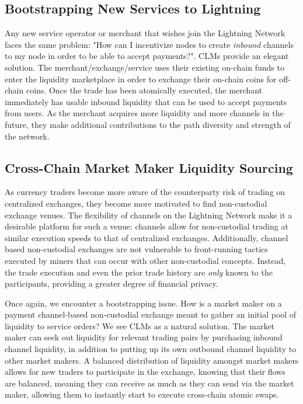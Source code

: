 \documentclass[10pt,a4paper]{article}
\theoremstyle{definition}
\begin{document}
\subsection{Bootstrapping New Services to Lightning}

Any new service operator or merchant that wishes join the Lightning Network
faces the same problem: "How can I incentivize nodes to create \emph{inbound}
channels to my node in order to be able to accept payments?". CLMs provide an
elegant solution. The merchant/exchange/service uses their existing on-chain
funds to enter the liquidity marketplace in order to exchange their on-chain
coins for off-chain coins. Once the trade has been atomically executed, the
merchant immediately has usable inbound liquidity that can be used to accept
payments from users. As the merchant acquires more liquidity and more channels
in the future, they make additional contributions to the path diversity and
strength of the network. 

\subsection{Cross-Chain Market Maker Liquidity Sourcing}

As currency traders become more aware of the counterparty risk of trading on
centralized exchanges, they become more motivated to find non-custodial
exchange venues. The flexibility of channels on the Lightning Network make it a
desirable platform for such a venue: channels allow for non-custodial trading
at similar execution speeds to that of centralized exchanges. Additionally,
channel based non-custodial exchanges are not vulnerable to front-running
tactics executed by miners that can occur with other non-custodial concepts.
Instead, the trade execution and even the prior trade history are \emph{only}
known to the participants, providing a greater degree of financial privacy.

Once again, we encounter a bootstrapping issue. How is a market maker on a
payment channel-based non-custodial exchange meant to gather an initial pool of
liquidity to service orders? We see CLMs as a natural solution. The market
maker can seek out liquidity for relevant trading pairs by purchasing inbound
channel liquidity, in addition to putting up its own outbound channel liquidity
to other market makers. A balanced distribution of liquidity amongst market
makers allows for new traders to participate in the exchange, knowing that
their flows are balanced, meaning they can receive as much as they can send via
the market maker, allowing them to instantly start to execute cross-chain
atomic swaps.
\end{document}
